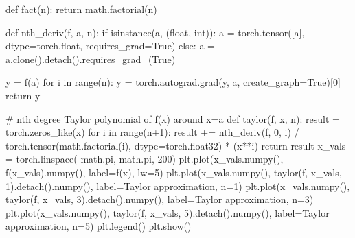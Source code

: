 \documentclass[
  letterpaper,
  DIV=11,
  numbers=noendperiod]{scrartcl}
\newenvironment{Shaded}{\begin{snugshade}}{\end{snugshade}}
\newcommand{\BuiltInTok}[1]{\textcolor[rgb]{0.00,0.23,0.31}{#1}}
\newcommand{\CommentTok}[1]{\textcolor[rgb]{0.37,0.37,0.37}{#1}}
\newcommand{\ControlFlowTok}[1]{\textcolor[rgb]{0.00,0.23,0.31}{#1}}
\newcommand{\DecValTok}[1]{\textcolor[rgb]{0.68,0.00,0.00}{#1}}
\newcommand{\KeywordTok}[1]{\textcolor[rgb]{0.00,0.23,0.31}{#1}}
\newcommand{\NormalTok}[1]{\textcolor[rgb]{0.00,0.23,0.31}{#1}}
\newcommand{\OperatorTok}[1]{\textcolor[rgb]{0.37,0.37,0.37}{#1}}
\newcommand{\StringTok}[1]{\textcolor[rgb]{0.13,0.47,0.30}{#1}}
\newcommand{\VariableTok}[1]{\textcolor[rgb]{0.07,0.07,0.07}{#1}}
\begin{document}
\begin{Shaded}
\begin{Highlighting}[]
\KeywordTok{def}\NormalTok{ fact(n):}
    \ControlFlowTok{return}\NormalTok{ math.factorial(n)}

\KeywordTok{def}\NormalTok{ nth\_deriv(f, a, n):}
    \ControlFlowTok{if} \BuiltInTok{isinstance}\NormalTok{(a, (}\BuiltInTok{float}\NormalTok{, }\BuiltInTok{int}\NormalTok{)):}
\NormalTok{        a }\OperatorTok{=}\NormalTok{ torch.tensor([a], dtype}\OperatorTok{=}\NormalTok{torch.}\BuiltInTok{float}\NormalTok{, requires\_grad}\OperatorTok{=}\VariableTok{True}\NormalTok{)}
    \ControlFlowTok{else}\NormalTok{:}
\NormalTok{        a }\OperatorTok{=}\NormalTok{ a.clone().detach().requires\_grad\_(}\VariableTok{True}\NormalTok{)}
    
\NormalTok{    y }\OperatorTok{=}\NormalTok{ f(a)}
    \ControlFlowTok{for}\NormalTok{ i }\KeywordTok{in} \BuiltInTok{range}\NormalTok{(n):}
\NormalTok{        y }\OperatorTok{=}\NormalTok{ torch.autograd.grad(y, a, create\_graph}\OperatorTok{=}\VariableTok{True}\NormalTok{)[}\DecValTok{0}\NormalTok{]}
    \ControlFlowTok{return}\NormalTok{ y}



\CommentTok{\# nth degree Taylor polynomial of f(x) around x=a}
\KeywordTok{def}\NormalTok{ taylor(f, x, n):}
\NormalTok{    result }\OperatorTok{=}\NormalTok{ torch.zeros\_like(x)}
    \ControlFlowTok{for}\NormalTok{ i }\KeywordTok{in} \BuiltInTok{range}\NormalTok{(n}\OperatorTok{+}\DecValTok{1}\NormalTok{):}
\NormalTok{        result }\OperatorTok{+=}\NormalTok{ nth\_deriv(f, }\DecValTok{0}\NormalTok{, i) }\OperatorTok{/}\NormalTok{ torch.tensor(math.factorial(i), dtype}\OperatorTok{=}\NormalTok{torch.float32) }\OperatorTok{*}\NormalTok{ (x}\OperatorTok{**}\NormalTok{i)}
    \ControlFlowTok{return}\NormalTok{ result}
\NormalTok{x\_vals }\OperatorTok{=}\NormalTok{ torch.linspace(}\OperatorTok{{-}}\NormalTok{math.pi, math.pi, }\DecValTok{200}\NormalTok{)}
\NormalTok{plt.plot(x\_vals.numpy(), f(x\_vals).numpy(), label}\OperatorTok{=}\StringTok{\textquotesingle{}f(x)\textquotesingle{}}\NormalTok{, lw}\OperatorTok{=}\DecValTok{5}\NormalTok{)}
\NormalTok{plt.plot(x\_vals.numpy(), taylor(f, x\_vals, }\DecValTok{1}\NormalTok{).detach().numpy(), label}\OperatorTok{=}\StringTok{\textquotesingle{}Taylor approximation, n=1\textquotesingle{}}\NormalTok{)}
\NormalTok{plt.plot(x\_vals.numpy(), taylor(f, x\_vals, }\DecValTok{3}\NormalTok{).detach().numpy(), label}\OperatorTok{=}\StringTok{\textquotesingle{}Taylor approximation, n=3\textquotesingle{}}\NormalTok{)}
\NormalTok{plt.plot(x\_vals.numpy(), taylor(f, x\_vals, }\DecValTok{5}\NormalTok{).detach().numpy(), label}\OperatorTok{=}\StringTok{\textquotesingle{}Taylor approximation, n=5\textquotesingle{}}\NormalTok{)}
\NormalTok{plt.legend()}
\NormalTok{plt.show()}
\end{Highlighting}
\end{Shaded}
\end{document}
